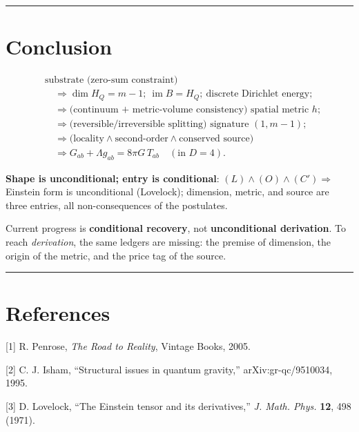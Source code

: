 \documentclass[
  11pt,
]{article}
\begin{document}
\begin{center}\rule{0.5\linewidth}{0.5pt}\end{center}

\section{Conclusion}\label{conclusion}

\[
\begin{aligned}
&\text{substrate (zero-sum constraint)}\\
&\quad\Longrightarrow \dim H_Q=m-1;\ \operatorname{im}B=H_Q;\ \text{discrete Dirichlet energy};\\
&\quad\Longrightarrow\text{(continuum + metric-volume consistency) spatial metric }h;\\
&\quad\Longrightarrow\text{(reversible/irreversible splitting) signature }(1,m-1);\\
&\quad\Longrightarrow\text{(locality}\wedge\text{second-order}\wedge\text{conserved source)}\\
&\quad\Longrightarrow G_{ab}+\Lambda g_{ab}=8\pi G\,T_{ab}\quad(\text{in }D=4).
\end{aligned}
\tag{10.1}
\]

\textbf{Shape is unconditional; entry is conditional}:
\((L)\wedge(O)\wedge(C')\Rightarrow\) Einstein form is unconditional
(Lovelock); dimension, metric, and source are three entries, all
non-consequences of the postulates.

Current progress is \textbf{conditional recovery}, not
\textbf{unconditional derivation}. To reach \emph{derivation}, the same
ledgers are missing: the premise of dimension, the origin of the metric,
and the price tag of the source.

\begin{center}\rule{0.5\linewidth}{0.5pt}\end{center}

\section*{References}\label{references}

{[}1{]} R. Penrose, \emph{The Road to Reality}, Vintage Books, 2005.

{[}2{]} C. J. Isham, ``Structural issues in quantum gravity,''
arXiv:gr-qc/9510034, 1995.

{[}3{]} D. Lovelock, ``The Einstein tensor and its derivatives,''
\emph{J. Math. Phys.} \textbf{12}, 498 (1971).
\end{document}
